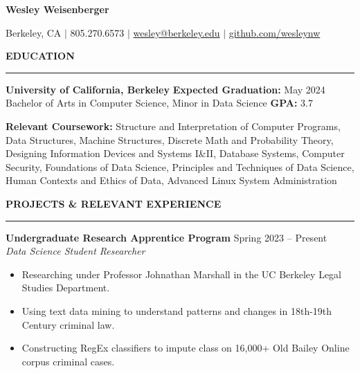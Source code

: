 \documentclass{article}
\begin{document}
    \newcommand{\header}[1]{ 
        \vspace{5mm}
        {\large \noindent \textbf{#1}}
        \vspace{1.5mm}
        \hrule
        \vspace{3.5mm}
    }




    {\huge \textbf{Wesley Weisenberger}}
    
    \vspace{1.5mm}

    {\Large Berkeley, CA  $\mid$ 805.270.6573 $\mid$ 
    \href{mailto:wesley@berkeley.edu}{wesley@berkeley.edu}
    $\mid$ 
    \href{https://github.com/wesleynw}{github.com/wesleynw}}
        
    \vspace{-2mm}

    \header{EDUCATION}

        \textbf{University of California, Berkeley} 
        \hfill 
        \textbf{Expected Graduation:} May 2024 \\
        Bachelor of Arts in Computer Science, Minor in Data Science \hfill \textbf{GPA:} 3.7

    \vspace{2.5mm}

    \textbf{Relevant Coursework:}
        Structure and Interpretation of Computer Programs, 
        Data Structures,
        Machine Structures,
        Discrete Math and Probability Theory, 
        Designing Information Devices and Systems I\&II,
        Database Systems,
        Computer Security,
        Foundations of Data Science,
        Principles and Techniques of Data Science, \\
        Human Contexts and Ethics of Data,
        Advanced Linux System Administration
        
    \header{PROJECTS \& RELEVANT EXPERIENCE}

    \noindent \textbf{Undergraduate Research Apprentice Program} \hfill Spring 2023 -- Present
    \\ \textit{Data Science Student Researcher}
    \begin{itemize}
        \item Researching under Professor Johnathan Marshall in the UC Berkeley Legal Studies Department.
        \item Using text data mining to understand patterns and changes in 18th-19th Century criminal law.
        \item Constructing RegEx classifiers to impute class on 16,000+ Old Bailey Online corpus criminal cases.
    \end{itemize}
\end{document}
